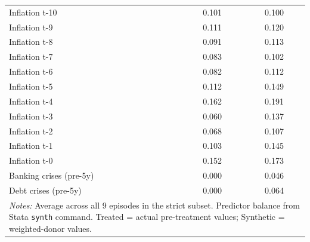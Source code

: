 \begin{tabular}{lcc}
Inflation t-10 & 0.101 & 0.100 \\
Inflation t-9 & 0.111 & 0.120 \\
Inflation t-8 & 0.091 & 0.113 \\
Inflation t-7 & 0.083 & 0.102 \\
Inflation t-6 & 0.082 & 0.112 \\
Inflation t-5 & 0.112 & 0.149 \\
Inflation t-4 & 0.162 & 0.191 \\
Inflation t-3 & 0.060 & 0.137 \\
Inflation t-2 & 0.068 & 0.107 \\
Inflation t-1 & 0.103 & 0.145 \\
Inflation t-0 & 0.152 & 0.173 \\
Banking crises (pre-5y) & 0.000 & 0.046 \\
Debt crises (pre-5y) & 0.000 & 0.064 \\
\hline\hline
\multicolumn{3}{p{10cm}}{\textit{Notes:} Average across all 9 episodes in the strict subset. Predictor balance from Stata \texttt{synth} command. Treated = actual pre-treatment values; Synthetic = weighted-donor values.} \\
\end{tabular}
